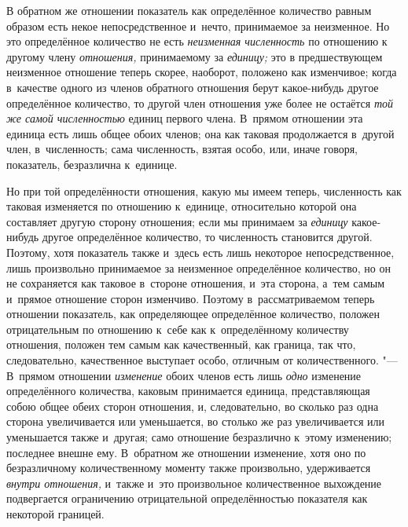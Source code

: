 В обратном же отношении показатель как определённое количество равным образом
есть некое непосредственное и~нечто, принимаемое за неизменное. Но это
определённое количество не есть {\em неизменная численность} по отношению к
другому члену {\em отношения,} принимаемому за {\em единицу;} это в
предшествующем неизменное отношение теперь скорее, наоборот, положено как
изменчивое; когда в~качестве одного из членов обратного отношения берут
какое-нибудь другое определённое количество, то другой член отношения уже более
не остаётся {\em той же самой численностью} единиц первого члена. В~прямом
отношении эта единица есть лишь общее обоих членов; она как таковая
продолжается в~другой член, в~численность; сама численность, взятая особо, или,
иначе говоря, показатель, безразлична к~единице.

Но при той определённости отношения, какую мы имеем теперь, численность как
таковая изменяется по отношению к~единице, относительно которой она составляет
другую сторону отношения; если мы принимаем за {\em единицу} какое-нибудь
другое определённое количество, то численность становится другой. Поэтому, хотя
показатель также и~здесь есть лишь некоторое непосредственное, лишь произвольно
принимаемое за неизменное определённое количество, но он не сохраняется как
таковое в~стороне отношения, и~эта сторона, а~тем самым и~прямое отношение
сторон изменчиво. Поэтому в~рассматриваемом теперь отношении показатель, как
определяющее определённое количество, положен отрицательным по отношению к~себе
как к~определённому количеству отношения, положен тем самым как качественный,
как граница, так что, следовательно, качественное выступает особо, отличным от
количественного. "--- В~прямом отношении {\em изменение} обоих членов есть лишь
{\em одно} изменение определённого количества, каковым принимается единица,
представляющая собою общее обеих сторон отношения, и, следовательно, во сколько
раз одна сторона увеличивается или уменьшается, во столько же раз увеличивается
или уменьшается также и~другая; само отношение безразлично к~этому изменению;
последнее внешне ему. В~обратном же отношении изменение, хотя оно по
безразличному количественному моменту также произвольно, удерживается
{\em внутри отношения,} и~также и~это произвольное количественное выхождение
подвергается ограничению отрицательной определённостью показателя как
некоторой границей.

